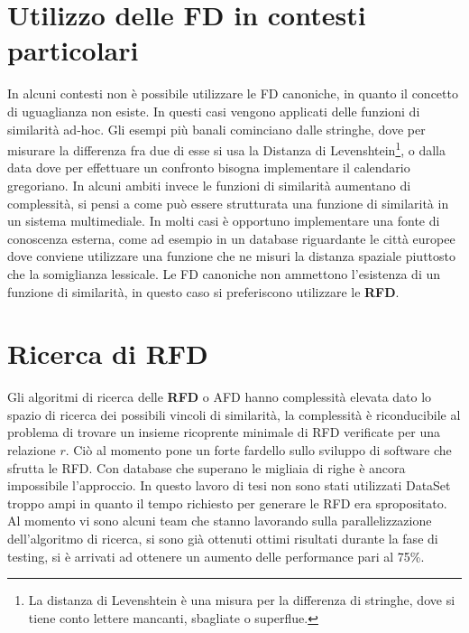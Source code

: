 \section{Utilizzo delle FD in contesti particolari}

In alcuni contesti non è possibile utilizzare le FD canoniche, in quanto il concetto di uguaglianza non esiste. In questi casi vengono applicati delle funzioni di similarità ad-hoc. Gli esempi più banali cominciano dalle stringhe, dove per misurare la differenza fra due di esse si usa la Distanza di Levenshtein\footnote{La distanza di Levenshtein è una misura per la differenza di stringhe, dove si tiene conto lettere mancanti, sbagliate o superflue.}, o dalla data  dove per effettuare un confronto bisogna implementare il calendario gregoriano. In alcuni ambiti invece le funzioni di similarità aumentano di complessità, si pensi a come può essere strutturata una funzione di similarità in un sistema multimediale. In molti casi è opportuno implementare una fonte di conoscenza esterna, come ad esempio in un database riguardante le città europee dove conviene utilizzare una funzione che ne misuri la distanza spaziale piuttosto che la somiglianza lessicale. Le FD canoniche non ammettono l'esistenza di un funzione di similarità, in questo caso si preferiscono utilizzare le \textbf{RFD}.

\section{Ricerca di RFD}
Gli algoritmi di ricerca delle \textbf{RFD} o AFD hanno complessità elevata dato lo spazio di ricerca dei possibili vincoli di similarità, la complessità è riconducibile al problema di trovare un insieme ricoprente minimale di RFD verificate per una relazione $r$. Ciò al momento pone un forte fardello sullo sviluppo di software che sfrutta le RFD. Con database che superano le migliaia di righe è ancora impossibile l’approccio. In questo lavoro di tesi non sono stati utilizzati DataSet troppo ampi in quanto il tempo richiesto per generare le RFD era spropositato. Al momento vi sono alcuni team che stanno lavorando sulla parallelizzazione dell'algoritmo di ricerca, si sono già ottenuti ottimi risultati durante la fase di testing, si è arrivati ad ottenere un aumento delle performance pari al 75\%.


